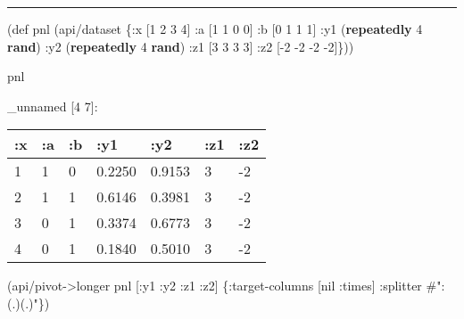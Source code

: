 \documentclass[]{article}
\newenvironment{Shaded}{\begin{snugshade}}{\end{snugshade}}
\newcommand{\KeywordTok}[1]{\textcolor[rgb]{0.13,0.29,0.53}{\textbf{#1}}}
\newcommand{\DecValTok}[1]{\textcolor[rgb]{0.00,0.00,0.81}{#1}}
\newcommand{\SpecialStringTok}[1]{\textcolor[rgb]{0.31,0.60,0.02}{#1}}
\newcommand{\FunctionTok}[1]{\textcolor[rgb]{0.00,0.00,0.00}{#1}}
\newcommand{\VariableTok}[1]{\textcolor[rgb]{0.00,0.00,0.00}{#1}}
\newcommand{\BuiltInTok}[1]{#1}
\newcommand{\AttributeTok}[1]{\textcolor[rgb]{0.77,0.63,0.00}{#1}}
\newcommand{\NormalTok}[1]{#1}
\begin{document}
\begin{center}\rule{0.5\linewidth}{0.5pt}\end{center}

\begin{Shaded}
\begin{Highlighting}[]
\NormalTok{(}\BuiltInTok{def}\FunctionTok{ pnl }\NormalTok{(api/dataset \{}\AttributeTok{:x}\NormalTok{ [}\DecValTok{1} \DecValTok{2} \DecValTok{3} \DecValTok{4}\NormalTok{]}
                       \AttributeTok{:a}\NormalTok{ [}\DecValTok{1} \DecValTok{1} \DecValTok{0} \DecValTok{0}\NormalTok{]}
                       \AttributeTok{:b}\NormalTok{ [}\DecValTok{0} \DecValTok{1} \DecValTok{1} \DecValTok{1}\NormalTok{]}
                       \AttributeTok{:y1}\NormalTok{ (}\KeywordTok{repeatedly} \DecValTok{4} \KeywordTok{rand}\NormalTok{)}
                       \AttributeTok{:y2}\NormalTok{ (}\KeywordTok{repeatedly} \DecValTok{4} \KeywordTok{rand}\NormalTok{)}
                       \AttributeTok{:z1}\NormalTok{ [}\DecValTok{3} \DecValTok{3} \DecValTok{3} \DecValTok{3}\NormalTok{]}
                       \AttributeTok{:z2}\NormalTok{ [-}\DecValTok{2} \DecValTok{-2} \DecValTok{-2} \DecValTok{-2}\NormalTok{]\}))}
\end{Highlighting}
\end{Shaded}

\begin{Shaded}
\begin{Highlighting}[]
\NormalTok{pnl}
\end{Highlighting}
\end{Shaded}

\_unnamed {[}4 7{]}:

\begin{longtable}[]{@{}lllllll@{}}
\toprule
:x & :a & :b & :y1 & :y2 & :z1 & :z2\tabularnewline
\midrule
\endhead
1 & 1 & 0 & 0.2250 & 0.9153 & 3 & -2\tabularnewline
2 & 1 & 1 & 0.6146 & 0.3981 & 3 & -2\tabularnewline
3 & 0 & 1 & 0.3374 & 0.6773 & 3 & -2\tabularnewline
4 & 0 & 1 & 0.1840 & 0.5010 & 3 & -2\tabularnewline
\bottomrule
\end{longtable}

\begin{Shaded}
\begin{Highlighting}[]
\NormalTok{(api/pivot->longer pnl [}\AttributeTok{:y1} \AttributeTok{:y2} \AttributeTok{:z1} \AttributeTok{:z2}\NormalTok{] \{}\AttributeTok{:target-columns}\NormalTok{ [}\VariableTok{nil} \AttributeTok{:times}\NormalTok{]}
                                          \AttributeTok{:splitter} \SpecialStringTok{#":(.)(.)"}\NormalTok{\})}
\end{Highlighting}
\end{Shaded}
\end{document}
